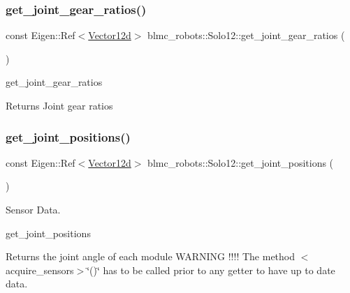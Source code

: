 \subsubsection{\texorpdfstring{get\+\_\+joint\+\_\+gear\+\_\+ratios()}{get\_joint\_gear\_ratios()}}
{\footnotesize\ttfamily const Eigen\+::\+Ref$<$\hyperlink{common__header_8hpp_a80313eb420184518596e745eecf4b494}{Vector12d}$>$ blmc\+\_\+robots\+::\+Solo12\+::get\+\_\+joint\+\_\+gear\+\_\+ratios (\begin{DoxyParamCaption}{ }\end{DoxyParamCaption})\hspace{0.3cm}{\ttfamily [inline]}}



get\+\_\+joint\+\_\+gear\+\_\+ratios 

\begin{DoxyReturn}{Returns}
Joint gear ratios 
\end{DoxyReturn}
\mbox{\label{classblmc__robots_1_1Solo12_a6ce3b791bba7cc37621a63ee6447c9c0}} 
\subsubsection{\texorpdfstring{get\+\_\+joint\+\_\+positions()}{get\_joint\_positions()}}
{\footnotesize\ttfamily const Eigen\+::\+Ref$<$\hyperlink{common__header_8hpp_a80313eb420184518596e745eecf4b494}{Vector12d}$>$ blmc\+\_\+robots\+::\+Solo12\+::get\+\_\+joint\+\_\+positions (\begin{DoxyParamCaption}{ }\end{DoxyParamCaption})\hspace{0.3cm}{\ttfamily [inline]}}



Sensor Data. 

get\+\_\+joint\+\_\+positions \begin{DoxyReturn}{Returns}
the joint angle of each module W\+A\+R\+N\+I\+NG !!!! The method $<$acquire\+\_\+sensors$>$\char`\"{}()\char`\"{} has to be called prior to any getter to have up to date data. 
\end{DoxyReturn}
\mbox{\label{classblmc__robots_1_1Solo12_ab8a6277bddcd64ec33eb8720d9478f7d}} 
